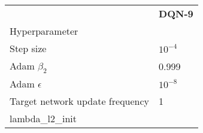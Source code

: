 \begin{tabular}{ll}
 & \bfseries DQN-9 \\
Hyperparameter &  \\
Step size & $10^{-4}$ \\
Adam $\beta_2$ & 0.999 \\
Adam $\epsilon$ & $10^{-8}$ \\
Target network update frequency & 1 \\
lambda_l2_init &  \\
\end{tabular}
